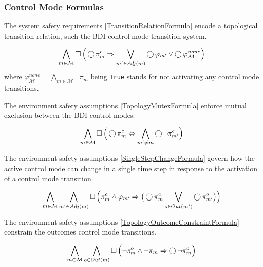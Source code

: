 
\subsubsection{Control Mode Formulas}

The system safety requirements \eqref{TransitionRelationFormula} encode a topological transition relation, such the BDI control mode transition system.


\begin{equation}\label{TransitionRelationFormula}
	\bigwedge \limits_{m \in \mathcal{M}} \operatorname{\Box} \Big( \operatorname{\bigcirc} \pi_m^c \Rightarrow \bigvee \limits_{m^\prime \in Adj(m)} \operatorname{\bigcirc} \varphi_{m^\prime} \vee \operatorname{\bigcirc} \varphi_\mathcal{M}^{none} \Big)
\end{equation}
where $\varphi_\mathcal{M}^{none} = \bigwedge \limits_{m \in \mathcal{M}} \lnot \pi_m$ being \texttt{True} stands for not activating any control mode transitions.

The environment safety assumptions \eqref{TopologyMutexFormula} enforce mutual exclusion between the BDI control modes.

\begin{equation}\label{TopologyMutexFormula}
	\bigwedge \limits_{m \in \mathcal{M}} \operatorname{\Box} \Big( \operatorname{\bigcirc} \pi_m^c \Leftrightarrow \bigwedge \limits_{m^\prime \neq m} \operatorname{\bigcirc} \lnot \pi_{m^\prime}^c \Big)
\end{equation}

The environment safety assumptions \eqref{SingleStepChangeFormula} govern how the active control mode can change in a single time step in response to the activation of a control mode transition.

\begin{equation}\label{SingleStepChangeFormula}
	\bigwedge \limits_{m \in \mathcal{M}} \bigwedge \limits_{m^\prime \in Adj(m)} \operatorname{\Box} \Big( \pi_m^c \wedge  \varphi_{m^\prime} \Rightarrow \big( \operatorname{\bigcirc} \pi_{m}^c \bigvee \limits_{o \in Out(m^\prime)} \operatorname{\bigcirc} \pi_{m^\prime}^o \big) \Big)
\end{equation}

The environment safety assumptions \eqref{TopologyOutcomeConstraintFormula} constrain the outcomes control mode transitions.

\begin{equation}\label{TopologyOutcomeConstraintFormula}
	\bigwedge \limits_{m \in \mathcal{M}} \bigwedge \limits_{o \in Out(m)} \operatorname{\Box} \Big( \lnot \pi_m^o \wedge \lnot \pi_m \Rightarrow \operatorname{\bigcirc} \lnot \pi_m^o \Big)
\end{equation}

